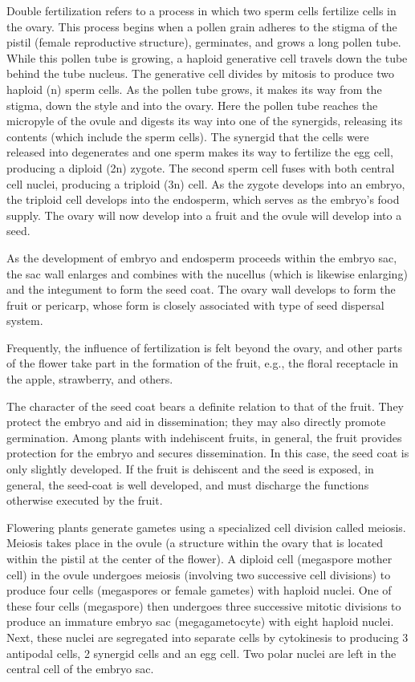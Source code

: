 \documentclass[]{book}
\theoremstyle{definition}
\theoremstyle{definition}
\theoremstyle{definition}
\theoremstyle{remark}
\begin{document}
Double fertilization refers to a process in which two sperm cells
fertilize cells in the ovary. This process begins when a pollen grain
adheres to the stigma of the pistil (female reproductive structure),
germinates, and grows a long pollen tube. While this pollen tube is
growing, a haploid generative cell travels down the tube behind the tube
nucleus. The generative cell divides by mitosis to produce two haploid
(n) sperm cells. As the pollen tube grows, it makes its way from the
stigma, down the style and into the ovary. Here the pollen tube reaches
the micropyle of the ovule and digests its way into one of the
synergids, releasing its contents (which include the sperm cells). The
synergid that the cells were released into degenerates and one sperm
makes its way to fertilize the egg cell, producing a diploid (2n)
zygote. The second sperm cell fuses with both central cell nuclei,
producing a triploid (3n) cell. As the zygote develops into an embryo,
the triploid cell develops into the endosperm, which serves as the
embryo's food supply. The ovary will now develop into a fruit and the
ovule will develop into a seed.

As the development of embryo and endosperm proceeds within the embryo
sac, the sac wall enlarges and combines with the nucellus (which is
likewise enlarging) and the integument to form the seed coat. The ovary
wall develops to form the fruit or pericarp, whose form is closely
associated with type of seed dispersal system.

Frequently, the influence of fertilization is felt beyond the ovary, and
other parts of the flower take part in the formation of the fruit, e.g.,
the floral receptacle in the apple, strawberry, and others.

The character of the seed coat bears a definite relation to that of the
fruit. They protect the embryo and aid in dissemination; they may also
directly promote germination. Among plants with indehiscent fruits, in
general, the fruit provides protection for the embryo and secures
dissemination. In this case, the seed coat is only slightly developed.
If the fruit is dehiscent and the seed is exposed, in general, the
seed-coat is well developed, and must discharge the functions otherwise
executed by the fruit.

Flowering plants generate gametes using a specialized cell division
called meiosis. Meiosis takes place in the ovule (a structure within the
ovary that is located within the pistil at the center of the flower). A
diploid cell (megaspore mother cell) in the ovule undergoes meiosis
(involving two successive cell divisions) to produce four cells
(megaspores or female gametes) with haploid nuclei. One of these four
cells (megaspore) then undergoes three successive mitotic divisions to
produce an immature embryo sac (megagametocyte) with eight haploid
nuclei. Next, these nuclei are segregated into separate cells by
cytokinesis to producing 3 antipodal cells, 2 synergid cells and an egg
cell. Two polar nuclei are left in the central cell of the embryo sac.
\end{document}
